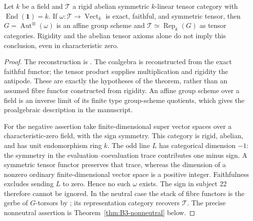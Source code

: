 \begin{theorem}\label{thm:B3-tannaka}
Let $k$ be a field and $\mathcal T$ a rigid abelian symmetric
$k$-linear tensor category with $\operatorname{End}(\mathbf1)=k$.
If $\omega:\mathcal T\to\operatorname{Vect}_k$ is exact, faithful,
and symmetric tensor, then $G=\operatorname{Aut}^{\otimes}(\omega)$
is an affine group scheme and
$\mathcal T\simeq\operatorname{Rep}_k(G)$ as tensor categories.
Rigidity and the abelian tensor axioms alone do not imply this
conclusion, even in characteristic zero.
\end{theorem}
\begin{proof}
The reconstruction is \cite[Theorem 2.11, pp.~20--28]{BDeligneMilne}.
The coalgebra is reconstructed from the exact faithful functor;
the tensor product supplies multiplication and rigidity the
antipode. These are exactly the hypotheses of the theorem, rather
than an assumed fibre functor constructed from rigidity.
An affine group scheme over a field is an inverse limit of its
finite type group-scheme quotients, which gives the proalgebraic
description in the manuscript.

For the negative assertion take finite-dimensional super vector
spaces over a characteristic-zero field, with the sign symmetry.
This category is rigid, abelian, and has unit endomorphism ring $k$.
The odd line $L$ has categorical dimension $-1$: the symmetry in
the evaluation--coevaluation trace contributes one minus sign.
A symmetric tensor functor preserves that trace, whereas the
dimension of a nonzero ordinary finite-dimensional vector space
is a positive integer. Faithfulness excludes sending $L$ to zero.
Hence no such $\omega$ exists. The sign in subject 22 therefore
cannot be ignored. In the neutral case the stack of fibre functors
is the gerbe of $G$-torsors by
\cite[Theorem 3.2 and Example 3.8]{BDeligneMilne}; its representation
category recovers $\mathcal T$. The precise nonneutral assertion is
Theorem~\ref{thm:B3-nonneutral} below.
\end{proof}

